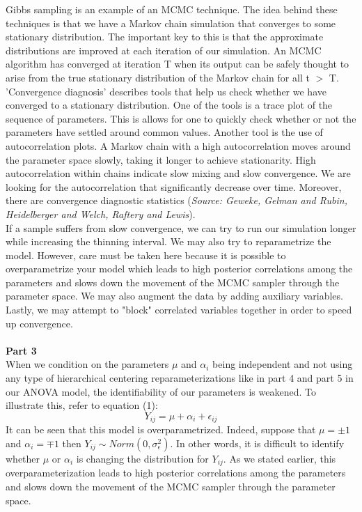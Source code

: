 \documentclass[10pt,a4paper]{article}
\begin{document}
Gibbs sampling is an example of an MCMC technique. The idea behind these techniques is that we have a Markov chain simulation that converges to some stationary distribution. The important key to this is that the approximate distributions are improved at each iteration of our simulation. An MCMC algorithm has converged at iteration T when its output can be safely thought to arise from the true stationary
distribution of the Markov chain for all t $>$ T. 'Convergence diagnosis' describes tools that help us check whether we have converged to a stationary distribution. One of the tools is a trace plot of the sequence of parameters. This is allows for one to quickly check whether or not the parameters have settled around common values. Another tool is the use of autocorrelation plots. A Markov chain with a high autocorrelation moves around the parameter space slowly, taking it longer to achieve stationarity. High autocorrelation within chains indicate slow mixing and slow convergence. We are
looking for the autocorrelation that significantly decrease over time. Moreover, there are convergence diagnostic statistics (\textit{Source: Geweke, Gelman and Rubin, Heidelberger and Welch, Raftery and Lewis}). \\
If a sample suffers from slow convergence, we can try to run our simulation longer while increasing the thinning interval. We may also try to reparametrize the model. However, care must be taken here because it is possible to overparametrize your model which leads to high posterior correlations among the parameters and slows down the movement of the MCMC sampler through the parameter space. We may also augment the data by adding auxiliary variables. Lastly, we may attempt to "block" correlated variables together in order to speed up convergence. \\
\\
\textbf{Part 3}\\
When we condition on the parameters $\mu$ and $\alpha_i$ being independent and not using any type of hierarchical  centering reparameterizations like in part 4 and part 5 in our ANOVA model, the identifiability of our parameters is weakened. To illustrate this, refer to equation (1):
$$Y_{ij}=\mu+\alpha_i+\epsilon_{ij}$$
It can be seen that this model is overparametrized. Indeed, suppose that $\mu=\pm 1$ and $\alpha_i=\mp 1$ then $Y_{ij} \sim Norm(0,\sigma_\epsilon^2)$. In other words, it is difficult to identify whether $\mu$ or $\alpha_i$ is changing the distribution for $Y_{ij}$. As we stated earlier, this overparameterization leads to high posterior correlations among the parameters and slows down the movement of the MCMC sampler through the parameter space.
\end{document}
